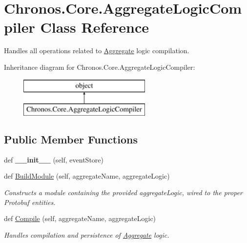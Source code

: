 \hypertarget{classChronos_1_1Core_1_1AggregateLogicCompiler}{}\section{Chronos.\+Core.\+Aggregate\+Logic\+Compiler Class Reference}
\label{classChronos_1_1Core_1_1AggregateLogicCompiler}


Handles all operations related to \hyperlink{classChronos_1_1Core_1_1Aggregate}{Aggregate} logic compilation.  


Inheritance diagram for Chronos.\+Core.\+Aggregate\+Logic\+Compiler\+:\begin{figure}[H]
\begin{center}
\leavevmode
\includegraphics[height=2.000000cm]{classChronos_1_1Core_1_1AggregateLogicCompiler}
\end{center}
\end{figure}
\subsection*{Public Member Functions}
\begin{DoxyCompactItemize}
\item 
def {\bfseries \+\_\+\+\_\+init\+\_\+\+\_\+} (self, event\+Store)
\item 
def \hyperlink{group__Chronos_ga751fbece3b09db34133314bfde9052f6}{Build\+Module} (self, aggregate\+Name, aggregate\+Logic)
\begin{DoxyCompactList}\small\item\em Constructs a module containing the provided aggregate\+Logic, wired to the proper Protobuf entities. \end{DoxyCompactList}\item 
def \hyperlink{group__Chronos_ga5c8b8498a50aa6157dbf12c35c09748f}{Compile} (self, aggregate\+Name, aggregate\+Logic)
\begin{DoxyCompactList}\small\item\em Handles compilation and persistence of \hyperlink{classChronos_1_1Core_1_1Aggregate}{Aggregate} logic. \end{DoxyCompactList}\end{DoxyCompactItemize}
